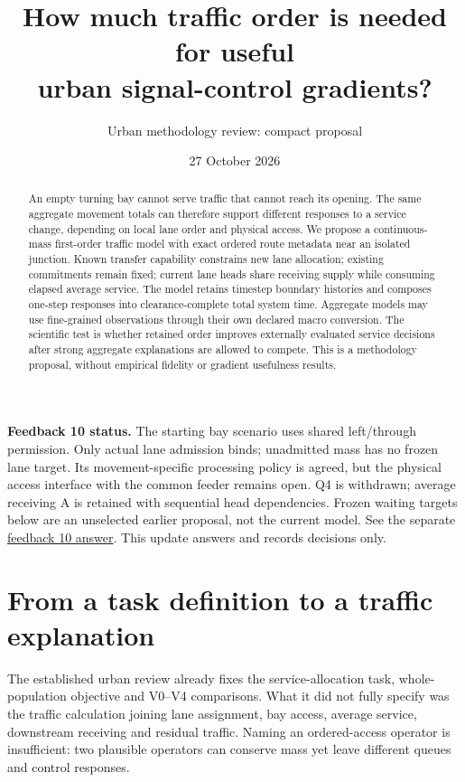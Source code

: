 \documentclass[11pt,a4paper]{article}
\title{How much traffic order is needed for useful\\urban signal-control gradients?}
\author{Urban methodology review: compact proposal}
\date{27 October 2026}
\begin{document}
\maketitle
\begin{abstract}
An empty turning bay cannot serve traffic that cannot reach its opening.
The same aggregate movement totals can therefore support different responses
to a service change, depending on local lane order and physical access.
We propose a continuous-mass first-order traffic model with exact ordered
route metadata near an isolated junction. Known transfer capability constrains
new lane allocation; existing commitments remain fixed; current lane heads
share receiving supply while consuming elapsed average service. The model
retains timestep boundary histories and composes one-step responses into
clearance-complete total system time. Aggregate models may use fine-grained
observations through their own declared macro conversion. The scientific
test is whether retained order improves externally evaluated service
decisions after strong aggregate explanations are allowed to compete.
This is a methodology proposal, without empirical fidelity or gradient
usefulness results.
\end{abstract}

\textbf{Feedback 10 status.}
The starting bay scenario uses shared left/through permission. Only actual
lane admission binds; unadmitted mass has no frozen lane target. Its
movement-specific processing policy is agreed, but the physical access
interface with the common feeder remains open. Q4 is withdrawn; average
receiving A is retained with sequential head dependencies. Frozen waiting
targets below are an unselected earlier proposal, not the current model.
See the separate \href{urban_feedback10_response.md}{feedback 10 answer}.
This update answers and records decisions only.



\section{From a task definition to a traffic explanation}

The established urban review already fixes the service-allocation task,
whole-population objective and V0--V4 comparisons. What it did not fully
specify was the traffic calculation joining lane assignment, bay access,
average service, downstream receiving and residual traffic. Naming an
ordered-access operator is insufficient: two plausible operators can
conserve mass yet leave different queues and control responses.
\end{document}
